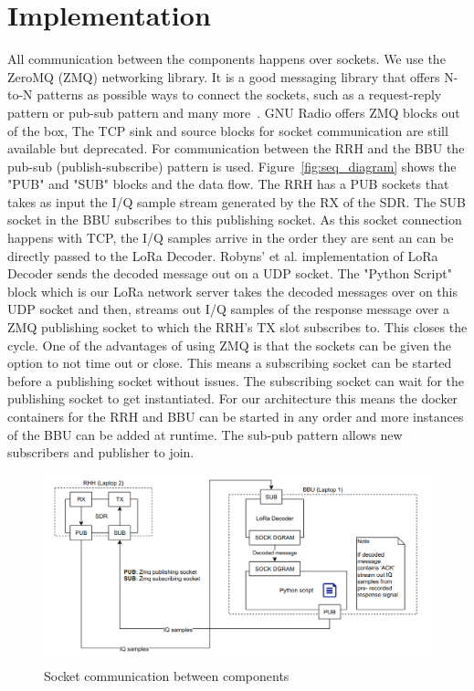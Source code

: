\section{Implementation}
All communication between the components happens over sockets. We use the ZeroMQ (ZMQ) networking library.
It is a good messaging library that offers N-to-N patterns as possible ways to connect the sockets, such as a request-reply pattern
or pub-sub pattern and many more~\cite{zeromq}.
GNU Radio offers ZMQ blocks out of the box, The TCP sink and source blocks for socket communication are still available but deprecated. 
For communication between the RRH and the BBU the pub-sub (publish-subscribe) pattern is used.
Figure~\ref{fig:seq_diagram} shows the "PUB" and "SUB" blocks and the data flow.
The RRH has a PUB sockets that takes as input the I/Q sample stream generated by the RX of the SDR.
The SUB socket in the BBU subscribes to this publishing socket. As this socket connection happens with TCP, the I/Q samples arrive in the order
they are sent an can be directly passed to the LoRa Decoder. Robyns' et al. implementation of LoRa Decoder sends the decoded message 
out on a UDP socket.  The "Python Script" block which is our LoRa network server takes the decoded messages over on this UDP socket and then, streams out 
I/Q samples of the response message over a ZMQ publishing socket to which the RRH's TX slot subscribes to. This closes the cycle.
One of the advantages of using ZMQ is that the sockets can be given the option to not time out or close. This means a subscribing socket 
can be started before a publishing socket without issues. The subscribing socket can wait for the publishing socket to get instantiated. For our architecture 
this means the docker containers for the RRH and BBU can be started in any order and more instances of the BBU can be added at runtime. The sub-pub pattern 
allows new subscribers and publisher to join.

\begin{figure}[h]
    \centering
    \includegraphics[width=1\textwidth]{figures/impl_diagram.png}
    \caption{Socket communication between components}
    \label{fig:impl_diagram}
\end{figure}

